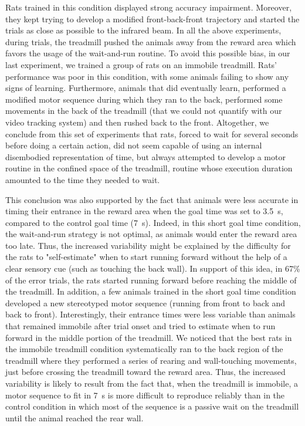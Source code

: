 Rats trained in this condition displayed strong accuracy impairment.
Moreover, they kept trying to develop a modified front-back-front trajectory and started the trials as close as possible to the infrared beam.
In all the above experiments, during trials, the treadmill pushed the animals away from the reward area which favors the usage of the wait-and-run routine.
To avoid this possible bias, in our last experiment, we trained a group of rats on an immobile treadmill.
Rats' performance was poor in this condition, with some animals failing to show any signs of learning.
Furthermore, animals that did eventually learn, performed a modified motor sequence during which they ran to the back, performed some movements in the back of the treadmill (that we could not quantify with our video tracking system) and then rushed back to the front.
Altogether, we conclude from this set of experiments that rats, forced to wait for several seconds before doing a certain action, did not seem capable of using an internal disembodied representation of time, but always attempted to develop a motor routine in the confined space of the treadmill, routine whose execution duration amounted to the time they needed to wait.
\par
This conclusion was also supported by the fact that animals were less accurate in timing their entrance in the reward area when the goal time was set to 3.5~s, compared to the control goal time (7~s).
Indeed, in this short goal time condition, the wait-and-run strategy is not optimal, as animals would enter the reward area too late.
Thus, the increased variability might be explained by the difficulty for the rats to "self-estimate" when to start running forward without the help of a clear sensory cue (such as touching the back wall).
In support of this idea, in 67\% of the error trials, the rats started running forward before reaching the middle of the treadmill.
In addition, a few animals trained in the short goal time condition developed a new stereotyped motor sequence (running from front to back and back to front).
Interestingly, their entrance times were less variable than animals that remained immobile after trial onset and tried to estimate when to run forward in the middle portion of the treadmill.
We noticed that the best rats in the immobile treadmill condition systematically ran to the back region of the treadmill where they performed a series of rearing and wall-touching movements, just before crossing the treadmill toward the reward area.
Thus, the increased variability is likely to result from the fact that, when the treadmill is immobile, a motor sequence to fit in 7~s is more difficult to reproduce reliably than in the control condition in which most of the sequence is a passive wait on the treadmill until the animal reached the rear wall.
